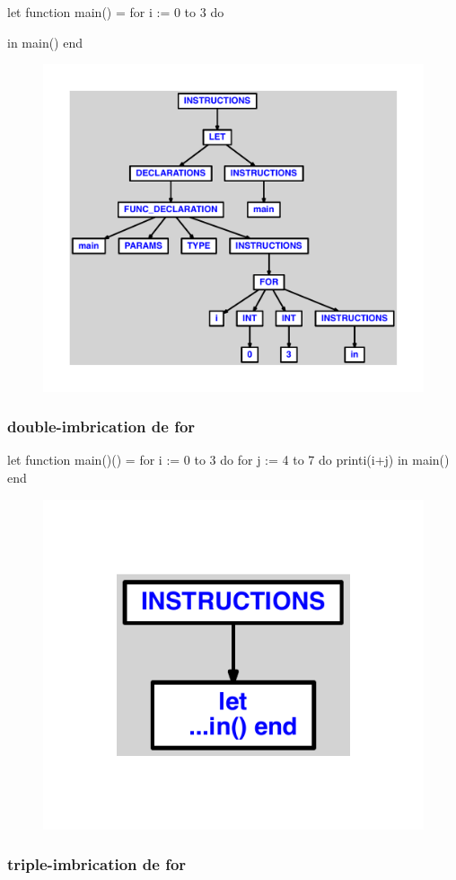 \documentclass{article}
\begin{document}
\begin{verbatimtab}
let
	function main() =
		for i := 0 to 3 do

in main() end
\end{verbatimtab}
\begin{figure}[H]\centering\includegraphics[max width=\textwidth]{ast/ast_199.pdf}\end{figure}\subsubsection{double-imbrication de for}
\begin{verbatimtab}
let
	function main()() =
		for i := 0 to 3 do
			for j := 4 to 7 do
				printi(i+j)
in main() end
\end{verbatimtab}
\begin{figure}[H]\centering\includegraphics[max width=\textwidth]{ast/ast_200.pdf}\end{figure}\subsubsection{triple-imbrication de for}
\end{document}
